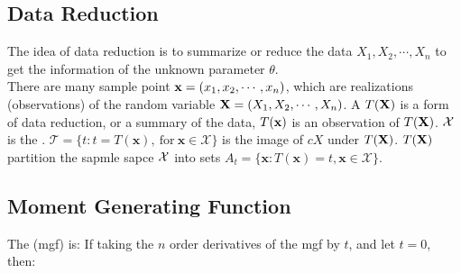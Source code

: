 \documentclass[10pt]{report}
\begin{document}
\subsection{Data Reduction}

The idea of data reduction is to summarize or reduce the data $X_1,X_2,\cdots,X_n$ to get the information of the unknown parameter $\theta$.\\
There are many sample point $\bold{x}=(x_1,x_2,\cdots,x_n)$, which are realizations (observations) of the random variable $\bold{X}=(X_1,X_2,\cdots,X_n)$.
A  $T(\bold{X})$ is a form of data reduction, or a summary of the data, $T(\bold{x})$ is an observation of $T(\bold{X})$. $\mathcal{X}$ is
the . $\mathcal{T}=\{t:t=T(\mathbf{x}),\mathrm{~for~}\mathbf{x}\in\mathcal{X}\}$ is the image of $cX$ under $T(\bold{X})$.
$T(\bold{X})$ partition the sapmle sapce $\mathcal{X}$ into sets $A_t=\{\mathbf{x}:T(\mathbf{x})=t,\mathbf{x}\in\mathcal{X}\}$.

\subsection{Moment Generating Function}
The  (mgf) is:
If taking the $n$ order derivatives of the mgf by $t$, and let $t=0$, then:
\end{document}
